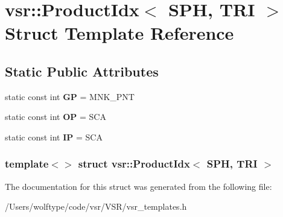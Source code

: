 \hypertarget{structvsr_1_1_product_idx_3_01_s_p_h_00_01_t_r_i_01_4}{\section{vsr\-:\-:Product\-Idx$<$ S\-P\-H, T\-R\-I $>$ Struct Template Reference}
\label{structvsr_1_1_product_idx_3_01_s_p_h_00_01_t_r_i_01_4}
}
\subsection*{Static Public Attributes}
\begin{DoxyCompactItemize}
\item 
\hypertarget{structvsr_1_1_product_idx_3_01_s_p_h_00_01_t_r_i_01_4_ac67bec429606e161de56d65f0076eadd}{static const int {\bfseries G\-P} = M\-N\-K\-\_\-\-P\-N\-T}\label{structvsr_1_1_product_idx_3_01_s_p_h_00_01_t_r_i_01_4_ac67bec429606e161de56d65f0076eadd}

\item 
\hypertarget{structvsr_1_1_product_idx_3_01_s_p_h_00_01_t_r_i_01_4_ae4d583c2a863ff74b38521f8fb9effa1}{static const int {\bfseries O\-P} = S\-C\-A}\label{structvsr_1_1_product_idx_3_01_s_p_h_00_01_t_r_i_01_4_ae4d583c2a863ff74b38521f8fb9effa1}

\item 
\hypertarget{structvsr_1_1_product_idx_3_01_s_p_h_00_01_t_r_i_01_4_a097eed254f7085454dc8d51789a4e545}{static const int {\bfseries I\-P} = S\-C\-A}\label{structvsr_1_1_product_idx_3_01_s_p_h_00_01_t_r_i_01_4_a097eed254f7085454dc8d51789a4e545}

\end{DoxyCompactItemize}
\subsubsection*{template$<$$>$ struct vsr\-::\-Product\-Idx$<$ S\-P\-H, T\-R\-I $>$}



The documentation for this struct was generated from the following file\-:\begin{DoxyCompactItemize}
\item 
/\-Users/wolftype/code/vsr/\-V\-S\-R/vsr\-\_\-templates.\-h\end{DoxyCompactItemize}
